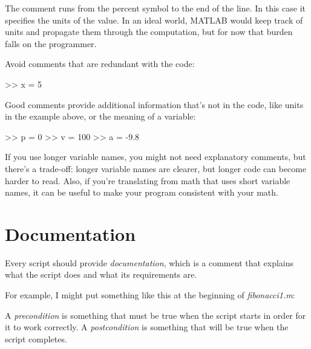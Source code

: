 The comment runs from the percent symbol to the end of the line.
In this case it specifies the units of the value.  In an ideal world,
MATLAB would keep track of units and propagate them through the
computation, but for now that burden falls on the programmer.


Avoid comments that are redundant with the code:

\begin{code}
>> x = 5        %
\end{code}

Good comments provide additional information that's not in the
code, like units in the example above, or the meaning of a variable:

\begin{code}
>> p = 0         %
>> v = 100       %
>> a = -9.8      %
\end{code}

If you use longer variable names, you might not need explanatory
comments, but there's a trade-off: longer variable names are clearer, but longer code can become harder
to read.
Also, if you're translating from math
that uses short variable names, it can be useful to make your
program consistent with your math.


\section{Documentation}

Every script should provide \emph{documentation}, which is a comment
that explains what the script does and what its requirements are.

For example, I might put something like this at the beginning of \emph{fibonacci1.m}:


\begin{code}
\end{code}

A \emph{precondition} is something that must be true when the script
starts in order for it to work correctly.  A \emph{postcondition}
is something that will be true when the script completes.

